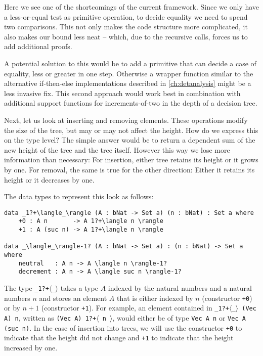 Here we see one of the shortcomings of the current framework. Since we only have a less-or-equal test as primitive operation, to decide equality we need to spend two comparisons. This not only makes the code structure more complicated, it also makes our bound less neat -- which, due to the recursive calls, forces us to add additional proofs.

A potential solution to this would be to add a primitive that can decide a case of equality, less or greater in one step. Otherwise a wrapper function similar to the alternative if-then-else implementations described in \autoref{ch:detanalysis} might be a less invasive fix. This second approach would work best in combination with additional support functions for increments-of-two in the depth of a decision tree.

Next, let us look at inserting and removing elements. These operations modify the size of the tree, but may or may not affect the height. How do we express this on the type level? The simple answer would be to return a dependent sum of the new height of the tree and the tree itself. However this way we lose more information than necessary: For insertion, either tree retains its height or it grows by one. For removal, the same is true for the other direction: Either it retains its height or it decreases by one.

The data types to represent this look as follows:

\begin{lstlisting}[caption={Maybe-Increment and Maybe-Decrement},label={lst:tree:inc-type},emph={neutral,decrement}]
data _1?+\langle_\rangle (A : bNat -> Set a) (n : bNat) : Set a where
    +0 : A n       -> A 1?+\langle n \rangle
    +1 : A (suc n) -> A 1?+\langle n \rangle

data _\langle_\rangle-1? (A : bNat -> Set a) : (n : bNat) -> Set a where
    neutral   : A n -> A \langle n \rangle-1?
    decrement : A n -> A \langle suc n \rangle-1?
\end{lstlisting}

The type \texttt{\_1?+$\langle$\_$\rangle$} takes a type $A$ indexed by the natural numbers and a natural numbers $n$ and stores an element $A$ that is either indexed by $n$ (constructor \texttt{+0}) or by $n+1$ (constructor \texttt{+1}). For example, an element contained in \texttt{\_1?+$\langle$\_$\rangle$ (Vec A) n}, written as \texttt{(Vec A) 1?+$\langle$ n $\rangle$}, would either be of type \texttt{Vec A n} or \texttt{Vec A (suc n)}. In the case of insertion into trees, we will use the constructor \texttt{+0} to indicate that the height did not change and \texttt{+1} to indicate that the height increased by one.

